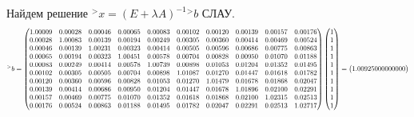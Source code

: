 \documentclass[a4paper, 12pt]{extarticle}
\begin{document}
Найдем решение ${^>x} = (E + \lambda A)^{-1} {^>b}$ СЛАУ.\\

\begin{equation}
    \scalemath{0.8}{
        {^>b} = \begin{pmatrix}
            1.00009 & 0.00028 & 0.00046 & 0.00065 & 0.00083 & 0.00102 & 0.00120 & 0.00139 & 0.00157 & 0.00176 \\ 
            0.00028 & 1.00083 & 0.00139 & 0.00194 & 0.00249 & 0.00305 & 0.00360 & 0.00414 & 0.00469 & 0.00524 \\ 
            0.00046 & 0.00139 & 1.00231 & 0.00323 & 0.00414 & 0.00505 & 0.00596 & 0.00686 & 0.00775 & 0.00863 \\ 
            0.00065 & 0.00194 & 0.00323 & 1.00451 & 0.00578 & 0.00704 & 0.00828 & 0.00950 & 0.01070 & 0.01188 \\ 
            0.00083 & 0.00249 & 0.00414 & 0.00578 & 1.00739 & 0.00898 & 0.01053 & 0.01204 & 0.01352 & 0.01495 \\ 
            0.00102 & 0.00305 & 0.00505 & 0.00704 & 0.00898 & 1.01087 & 0.01270 & 0.01447 & 0.01618 & 0.01782 \\ 
            0.00120 & 0.00360 & 0.00596 & 0.00828 & 0.01053 & 0.01270 & 1.01479 & 0.01678 & 0.01868 & 0.02047 \\ 
            0.00139 & 0.00414 & 0.00686 & 0.00950 & 0.01204 & 0.01447 & 0.01678 & 1.01896 & 0.02100 & 0.02291 \\ 
            0.00157 & 0.00469 & 0.00775 & 0.01070 & 0.01352 & 0.01618 & 0.01868 & 0.02100 & 1.02315 & 0.02513 \\ 
            0.00176 & 0.00524 & 0.00863 & 0.01188 & 0.01495 & 0.01782 & 0.02047 & 0.02291 & 0.02513 & 1.02717 
        \end{pmatrix}
        \begin{pmatrix}
            1 \\ 
            1 \\ 
            1 \\ 
            1 \\ 
            1 \\ 
            1 \\ 
            1 \\ 
            1 \\ 
            1 \\ 
            1 
        \end{pmatrix}
        =
        \begin{pmatrix}
            1.00925000000000\\ 

\end{pmatrix}}
\end{equation}
\end{document}
